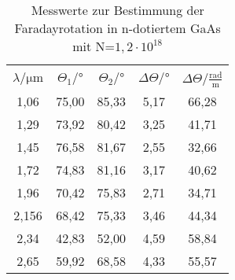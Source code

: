 \begin{table}[H]
  \centering
  \caption{Messwerte zur Bestimmung der Faradayrotation in n-dotiertem GaAs mit N=$1,2\cdot10^{18}$}
  \label{tab:tabe3}
    \begin{tabular}{S S S S S}
    \toprule \\
    {$\lambda / \si{\micro\metre} $} & {$\Theta_1 /° $} & {$\Theta_2 /° $} & {$\Delta \Theta /° $} &
    {$\Delta \Theta / \frac{\text{rad}}{\text{m}} $}\\
    ,06 & 75,00 & 85,33 & 5,17 & 66,28 \\
    1,29 & 73,92 & 80,42 & 3,25 & 41,71 \\
    1,45 & 76,58 & 81,67 & 2,55 & 32,66 \\
    1,72 & 74,83 & 81,16 & 3,17 & 40,62 \\
    1,96 & 70,42 & 75,83 & 2,71 & 34,71 \\
    2,156 & 68,42 & 75,33 & 3,46 & 44,34 \\
    2,34 & 42,83 & 52,00 & 4,59 & 58,84 \\
    2,65 & 59,92 & 68,58 & 4,33 & 55,57 \\


          \bottomrule
        \end{tabular}
\end{table}
